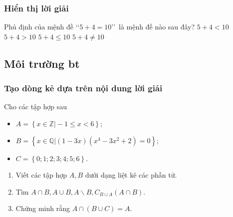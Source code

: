 \documentclass[Main.tex]{subfiles}
\begin{document}
	\subsubsection{Hiển thị lời giải}
	\hienthiloigiaiex
	\begin{ex}
		Phủ định của mệnh đề \lq\lq$5+4=10$\rq\rq\ là mệnh đề nào sau đây?
		\choice
		{$5+4<10$}
		{$5+4>10$}
		{$5+4\le 10$}
		{\True $5+4\ne 10$}
	\end{ex}
	\subsection{Môi trường bt}
	\subsubsection{Tạo dòng kẻ dựa trên nội dung lời giải}
	\dongkebt
	\begin{bt}
		Cho các tập hợp sau
		\begin{itemize}
			\item $A=\left\{\left. x\in \mathbb{Z}\right|-1\le x<6\right\}$;
			\item $B=\left\{\left. x\in \mathbb{Q}\right|\left(1-3x\right)\left(x^4-3x^2+2\right)=0\right\}$;
			\item $C=\left\{0;1;2;3;4;5;6\right\}$.
		\end{itemize}
		
		\begin{enumerate}
			\item Viết các tập hợp $A, B$ dưới dạng liệt kê các phần tử.
			\item Tìm $A\cap B,A\cup B,A\backslash B,{C}_{B\cup A}\left(A\cap B\right)$.
			\item Chứng minh rằng $A\cap (B\cup C)=A.$
		\end{enumerate}
	\end{bt}
	
\end{document}
